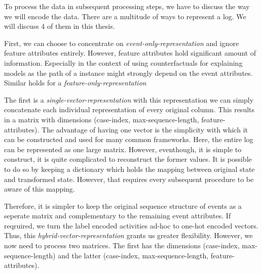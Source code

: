 \documentclass[./../../paper.tex]{subfiles}
\begin{document}
To process the data in subsequent processing steps, we have to discuss the way we will encode the data. There are a multitude of ways to represent a log. We will discuss 4 of them in this thesis.

First, we can choose to concentrate on \emph{event-only-representation} and ignore feature attributes entirely. However, feature attributes hold significant amount of information. Especially in the context of using counterfactuals for explaining models as the path of a \gls{instance} might strongly depend on the event attributes. Similar holds for a \emph{feature-only-representation}

The first is a \emph{single-vector-representation} with this representation we can simply concatenate each individual representation of every original column. This results in a matrix with dimensions (case-index, max-sequence-length, feature-attributes). The advantage of having one vector is the simplicity with which it can be constructed and used for many common frameworks. Here, the entire log can be represented as one large matrix. However, eventhough, it is simple to construct, it is quite complicated to reconstruct the former values. It is possible to do so by keeping a dictionary which holds the mapping between original state and transformed state. However, that requires every subsequent procedure to be aware of this mapping.

Therefore, it is simpler to keep the original sequence structure of events as a seperate matrix and complementary to the remaining event attributes. If reqruired, we turn the label encoded activities ad-hoc to one-hot encoded vectors. Thus, this \emph{hybrid-vector-representation} grants us greater flexibility. However, we now need to process two matrices. The first has the dimensions (case-index, max-sequence-length) and the latter (case-index, max-sequence-length, feature-attributes). 
\end{document}
